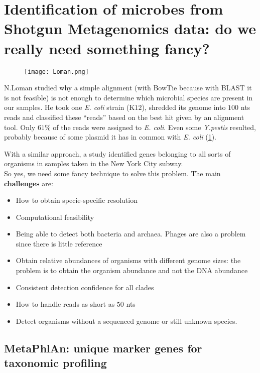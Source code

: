 \section{Identification of microbes from Shotgun Metagenomics data: do we really need something fancy?}

\begin{figure}[!h]
\centering
\texttt{[image: Loman.png]}
\caption{\label{fig:Loman}}
\end{figure}

 N.Loman studied why a simple alignment (with BowTie because with BLAST it is not feasible) is not enough to determine which microbial species are present in our samples. He took one \emph{E. coli} strain (K$12$), shredded its genome into $100$ nts reads and classified these “reads” based on the best hit given by an alignment tool. Only $61$\% of the reads were assigned to \emph{E. coli}. Even some \emph{Y.pestis} resulted, probably because of some plasmid it has in common with \emph{E. coli} (\ref{fig:Loman}).
 
 With a similar approach, a study identified genes belonging to all sorts of organisms in samples taken in the New York City subway. \\

So yes, we need some fancy technique to solve this problem. The main \textbf{challenges} are:
\begin{itemize}
    \item How to obtain specie-specific resolution
    \item Computational feasibility
    \item Being able to detect both bacteria and archaea. Phages are also a problem since there is little reference
    \item Obtain relative abundances of organisms with different genome sizes: the problem is to obtain the organism abundance and not the DNA abundance
    \item Consistent detection confidence for all clades
    \item How to handle reads as short as $50$ nts
    \item Detect organisms without a sequenced genome or still unknown species. 
\end{itemize}

\subsection{MetaPhlAn: unique marker genes for taxonomic profiling}

